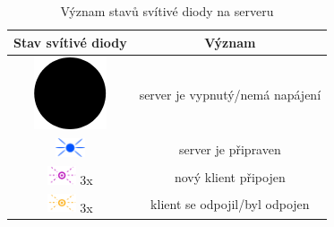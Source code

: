 \begin{table}[hbtp]
\centering
\newcommand{\LEDsingHeight}{0.55cm}
\caption{Význam stavů svítivé diody na serveru}
\label{tab:serverLED}
\label{tab:LED_man}
\begin{tabular}{|c|c|}
\hline
\textbf{Stav svítivé diody}                                            & \textbf{Význam}                  \\ \hline
\includegraphics[height=\LEDsingHeight/2]{img/manual/black.png}             & server je vypnutý/nemá napájení  \\ \hline
\includegraphics[height=\LEDsingHeight]{img/manual/blue.png}              & server je připraven              \\ \hline
\includegraphics[height=\LEDsingHeight]{img/manual/violet_blink.png} 3x   & nový klient připojen             \\ \hline
\includegraphics[height=\LEDsingHeight]{img/manual/orange_blink.png}   3x & klient se odpojil/byl odpojen    \\ \hline

\end{tabular}
\end{table}
